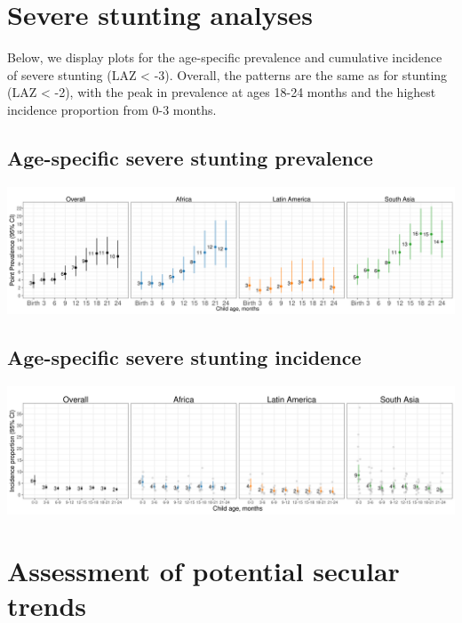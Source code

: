\documentclass[
  9pt,
]{book}
\begin{document}
\hypertarget{severe-stunting}{%
\chapter{Severe stunting analyses}\label{severe-stunting}}

\raggedright

Below, we display plots for the age-specific prevalence and cumulative incidence of severe stunting (LAZ \textless{} -3). Overall, the patterns are the same as for stunting (LAZ \textless{} -2), with the peak in prevalence at ages 18-24 months and the highest incidence proportion from 0-3 months.

\hypertarget{age-specific-severe-stunting-prevalence}{%
\section{Age-specific severe stunting prevalence}\label{age-specific-severe-stunting-prevalence}}

\includegraphics[width=58.33in]{figures//stunting/fig-stunt-3-prev-overall_region--allage-primary}

\hypertarget{age-specific-severe-stunting-incidence}{%
\section{Age-specific severe stunting incidence}\label{age-specific-severe-stunting-incidence}}

\includegraphics[width=58.33in]{figures//stunting/fig-stunt-3-inc-overall_region--allage-primary}

\hypertarget{secular-trends}{%
\chapter{Assessment of potential secular trends}\label{secular-trends}}
\end{document}
